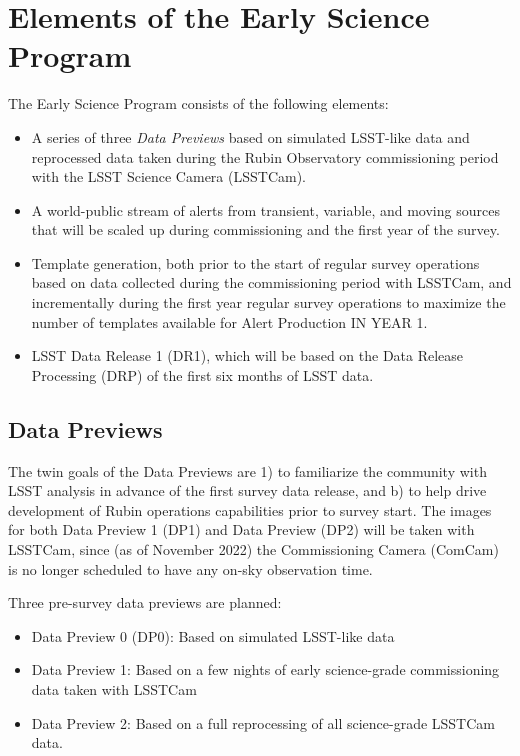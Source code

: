 \section{Elements of the Early Science Program}

The Early Science Program consists of the following elements:
\begin{itemize}
	\item A series of three \emph{Data Previews} based on simulated LSST-like data and reprocessed data taken during the Rubin Observatory commissioning period with the LSST Science Camera (LSSTCam).
	\item A world-public stream of alerts from transient, variable, and moving sources that will be scaled up during commissioning and the first year of the survey.
	\item Template generation, both prior to the start of regular survey operations based on data collected during the commissioning period with LSSTCam, and incrementally during the first year regular survey operations  to maximize the number of templates available for Alert Production IN YEAR 1.
	\item LSST Data Release 1 (DR1), which will be based on the Data Release Processing (DRP) of the first six months of LSST data.
\end{itemize}


\subsection{Data Previews}

The twin goals of the Data Previews are 1) to familiarize the community with LSST analysis in advance of the first survey data release, and b) to help drive development of Rubin operations capabilities prior to survey start.
The images for both Data Preview 1 (DP1) and Data Preview (DP2) will be taken with LSSTCam, since (as of November 2022) the Commissioning Camera (ComCam) is no longer scheduled to have any on-sky observation time.

Three pre-survey data previews are planned:
\begin{itemize}
\item  Data Preview 0 (DP0): Based on simulated LSST-like data
\item  Data Preview 1: Based on a few nights of early science-grade commissioning data taken with LSSTCam
\item Data Preview 2: Based on a full reprocessing of all science-grade LSSTCam data.

\end{itemize}


